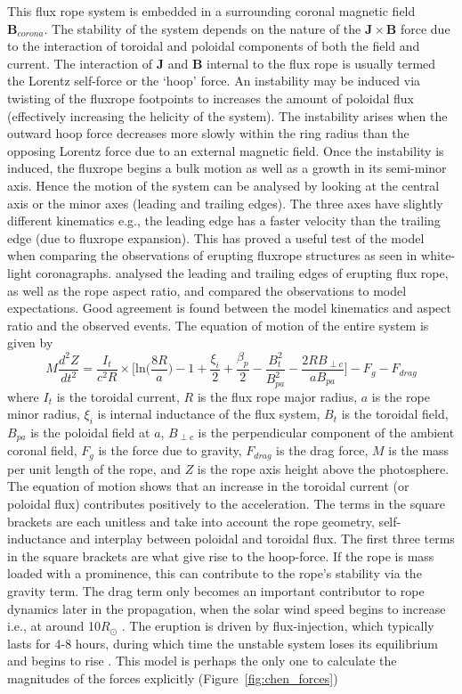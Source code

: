 This flux rope system is embedded in a surrounding coronal magnetic field $\mathbf{B}_{corona}$. The stability of the system depends on the nature of the $\mathbf{J} \times \mathbf{B}$ force due to the interaction of toroidal and poloidal components of both the field and current. The interaction of $\mathbf{J}$ and $\mathbf{B}$ internal to the flux rope is usually termed the Lorentz self-force or the \textquoteleft hoop' force. An instability may be induced via twisting of the fluxrope footpoints to increases the amount of poloidal flux (effectively increasing the helicity of the system). The instability arises when the outward hoop force decreases more slowly within the ring radius than the opposing Lorentz force due to an external magnetic field. Once the instability is induced, the fluxrope begins a bulk motion as well as a growth in its semi-minor axis. Hence the motion of the system can be analysed by looking at the central axis or the minor axes (leading and trailing edges). The three axes have slightly different kinematics e.g., the leading edge has a faster velocity than the trailing edge (due to fluxrope expansion). This has proved a useful test of the model when comparing the observations of erupting fluxrope structures as seen in white-light coronagraphs. \citet{krall2001} analysed the leading and trailing edges of erupting flux rope, as well as the rope aspect ratio, and compared the observations to model expectations. Good agreement is found between the model kinematics and aspect ratio and the observed events.
The equation of motion of the entire system is given by
\begin{equation}
M\frac{d^2Z}{dt^2} = \frac{I_t}{c^2R}\times\bigg[ \mathrm{ln}\bigg(\frac{8R}{a}\bigg) -1+ \frac{\xi_i}{2} + \frac{\beta_p}{2} -\frac{B^2_t}{B^2_{pa}}  -\frac{2RB_{\perp c}}{aB_{pa}} \bigg] - F_g - F_{drag}
\end{equation}
where $I_t$ is the toroidal current, $R$ is the flux rope major radius, $a$ is the rope minor radius, $\xi_i$ is internal inductance of the flux system, $B_t$ is the toroidal field, $B_{pa}$ is the poloidal field at $a$, $B_{\perp c}$ is the perpendicular component of the ambient coronal field, $F_g$ is the force due to gravity, $F_{drag}$ is the drag force, $M$ is the mass per unit length of the rope, and $Z$ is the rope axis height above the photosphere. The equation of motion shows that an increase in the toroidal current (or poloidal flux) contributes positively to the acceleration. The terms in the square brackets are each unitless and take into account the rope geometry, self-inductance and interplay between poloidal and toroidal flux. The first three terms in the square brackets are what give rise to the hoop-force. If the rope is mass loaded with a prominence, this can contribute to the rope's stability via the gravity term. The drag term only becomes an important contributor to rope dynamics later in the propagation, when the solar wind speed begins to increase i.e., at around 10$R_{\odot}$ \citep{sheeley1997}. The eruption is driven by flux-injection, which typically lasts for 4-8 hours, during which time the unstable system loses its equilibrium and begins to rise \citet{krall2001}. This model is perhaps the only one to calculate the magnitudes of the forces explicitly (Figure~\ref{fig:chen_forces})
